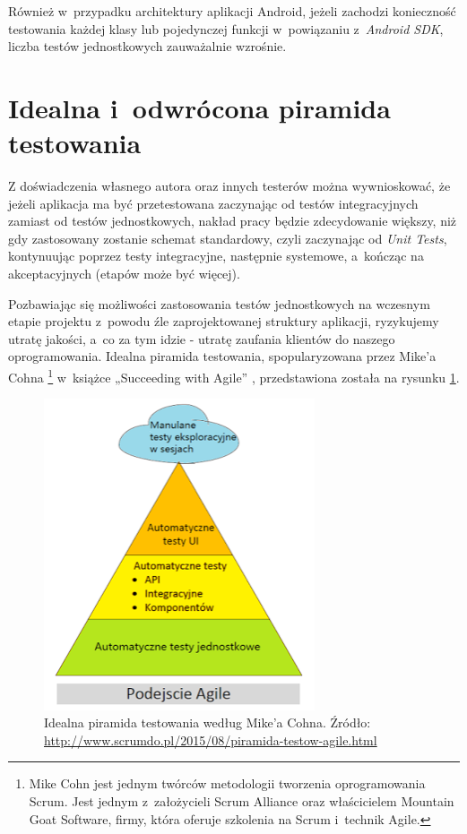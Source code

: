 Również w~przypadku architektury aplikacji Android, jeżeli zachodzi konieczność testowania każdej klasy lub pojedynczej funkcji w~powiązaniu z~\textit{Android SDK}, liczba testów jednostkowych zauważalnie wzrośnie.

\section{Idealna i~odwrócona piramida testowania}
\label{piramida_testowania}
Z doświadczenia własnego autora oraz innych testerów można wywnioskować, że jeżeli aplikacja ma być przetestowana zaczynając od testów integracyjnych zamiast od testów jednostkowych, nakład pracy będzie zdecydowanie większy, niż gdy zastosowany zostanie schemat standardowy, czyli zaczynając od \textit{Unit Tests}, kontynuując poprzez testy integracyjne, następnie systemowe, a~kończąc na akceptacyjnych (etapów może być więcej). 

Pozbawiając się możliwości zastosowania testów jednostkowych na wczesnym etapie projektu z~powodu źle zaprojektowanej struktury aplikacji, ryzykujemy utratę jakości, a~co za tym idzie - utratę zaufania klientów do naszego oprogramowania. Idealna piramida testowania, spopularyzowana przez Mike’a Cohna \footnote{Mike Cohn jest jednym twórców metodologii tworzenia oprogramowania Scrum. Jest jednym z~założycieli Scrum Alliance oraz właścicielem Mountain Goat Software, firmy, która oferuje szkolenia na Scrum i~technik Agile.}  w~książce „Succeeding with Agile” \cite{bib:cohn:agile}, przedstawiona została na rysunku \ref{fig:idealna_piramida}.

\begin{figure}[!htb]
    \centering
    \includegraphics[width=8cm]{imgs/ch3_idealna_piramida.png}
    \caption
{Idealna piramida testowania według Mike'a Cohna\cite{bib:cohn:agile}. Źródło: \url{http://www.scrumdo.pl/2015/08/piramida-testow-agile.html}}
    \label{fig:idealna_piramida}
\end{figure} 

